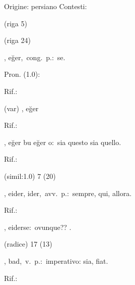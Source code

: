 \begin{glossario}{Origine: persiano}
Contesti:
\begin{subvocedue}
\item[(riga 5)] 
\item[(riga 24)] 
\end{subvocedue}
\item[{\color{colorlowref}\spzrl{eker}},] {\sf eğer},\ cong.\ p.:\ se.
\begin{subvocedue}
\item[Pron. (1.0):] 
\item[Rif.:] 
\end{subvocedue}
\begin{subvocedue}
\item[(var)] , {\sf eğer}\begin{subvocedue}
\item[Rif.:] 
\end{subvocedue}
\item[\subglossariobullet] , {\sf eğer bu eğer o}:\ sia questo sia quello.
\begin{subvocedue}
\item[Rif.:] 
\end{subvocedue}
\item[(simil:1.0)]   7 (20)
\end{subvocedue}
\item[{\color{colorlowref}\spzrl{aydir}},] {\sf eider, ider},\ avv.\ p.:\ sempre, qui, allora.
\begin{subvocedue}
\item[Rif.:] 
\end{subvocedue}
\begin{subvocedue}
\item[\subglossariobullet] , {\sf eiderse}:\ ovunque?? \verificare.
\item[(radice)]   17 (13)
\end{subvocedue}
\item[{\color{colorlowref}\spzrl{bAd}},] {\sf bad},\ v.\ p.:\ imperativo: sia, fiat.
\begin{subvocedue}
\item[Rif.:] 
\end{subvocedue}
\begin{subvocedue}

\end{subvocedue}
\end{glossario}
